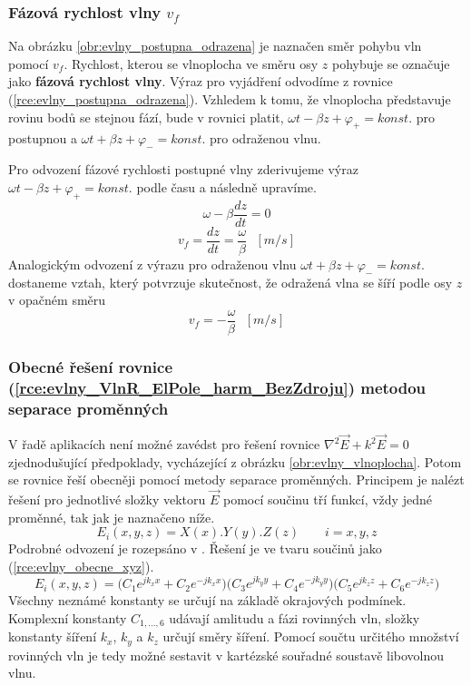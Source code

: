 \subsubsection*{Fázová rychlost vlny $v_{f}$}
Na obrázku \ref{obr:evlny_postupna_odrazena} je naznačen směr pohybu vln pomocí $v_{f}$. Rychlost, kterou se vlnoplocha ve směru osy $z$ pohybuje se označuje jako {\bf fázová rychlost vlny}. Výraz pro vyjádření odvodíme z rovnice (\ref{rce:evlny_postupna_odrazena}). Vzhledem k tomu, že vlnoplocha představuje rovinu bodů se stejnou fází, bude v rovnici platit, $\omega t - \beta z + \varphi_{+} = konst.$ pro postupnou a $\omega t + \beta z + \varphi_{-} = konst.$ pro odraženou vlnu.

Pro odvození fázové rychlosti postupné vlny zderivujeme výraz $\omega t - \beta z + \varphi_{+} = konst.$ podle času a následně upravíme.
\begin{displaymath}
	\omega - \beta \frac{dz}{dt} = 0
\end{displaymath}
\begin{displaymath}
	v_{f} = \frac{dz}{dt} = \frac{\omega}{\beta}  \ \ \ [m/s]
\end{displaymath}
Analogickým odvození z výrazu pro odraženou vlnu  $\omega t + \beta z + \varphi_{-} = konst.$ dostaneme vztah, který potvrzuje skutečnost, že odražená vlna se šíří podle osy $z$ v opačném směru 
\begin{displaymath}
	v_{f} = - \frac{\omega}{\beta}  \ \ \ [m/s]
\end{displaymath}

\subsubsection*{Obecné řešení rovnice (\ref{rce:evlny_VlnR_ElPole_harm_BezZdroju}) metodou separace proměnných}
V řadě aplikacích není možné zavédst pro řešení rovnice $\nabla^{2}\vec E +k^{2}\vec E = 0$  zjednodušující předpoklady, vycházející z obrázku \ref{obr:evlny_vlnoplocha}. Potom se rovnice řeší obecněji pomocí metody separace proměnných. Principem je nalézt řešení pro jednotlivé složky vektoru $\vec E$ pomocí součinu tří funkcí, vždy jedné proměnné, tak jak je naznačeno níže.
\begin{equation}
	E_{i}(x,y,z) = X(x).Y(y).Z(z)\qquad i = x, y, z
	\label{rce:evlny_obecne_xyz}
\end{equation}
Podrobné odvození je rozepsáno v \cite[str. 50]{emp}. Řešení je ve tvaru součinů jako (\ref{rce:evlny_obecne_xyz}).
\begin{equation}
	E_{i}(x,y,z) = \big( C_{1}e^{jk_{x}x} + C_{2}e^{-jk_{x}x} \big)\big( C_{3}e^{jk_{y}y} + C_{4}e^{-jk_{y}y} \big)\big( C_{5}e^{jk_{z}z} + C_{6}e^{-jk_{z}z} \big)
	\label{rce:evlny_obecne_reseni}
\end{equation}
Všechny neznámé konstanty se určují na základě okrajových podmínek. Komplexní konstanty $C_{1,\ldots,6}$ udávají amlitudu a fázi rovinných vln, složky konstanty šíření $k_{x}$, $k_{y}$ a $k_{z}$ určují směry šíření. Pomocí součtu určitého množství rovinných vln je tedy možné sestavit v kartézské souřadné soustavě libovolnou vlnu.

